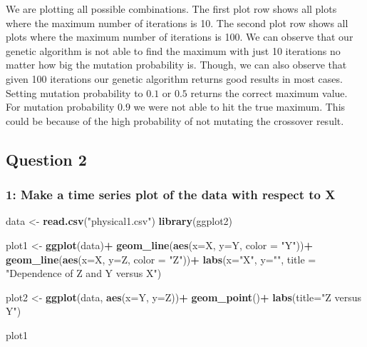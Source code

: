 \documentclass[
]{article}
\newenvironment{Shaded}{\begin{snugshade}}{\end{snugshade}}
\newcommand{\DataTypeTok}[1]{\textcolor[rgb]{0.13,0.29,0.53}{#1}}
\newcommand{\KeywordTok}[1]{\textcolor[rgb]{0.13,0.29,0.53}{\textbf{#1}}}
\newcommand{\NormalTok}[1]{#1}
\newcommand{\OperatorTok}[1]{\textcolor[rgb]{0.81,0.36,0.00}{\textbf{#1}}}
\newcommand{\StringTok}[1]{\textcolor[rgb]{0.31,0.60,0.02}{#1}}
\begin{document}
We are plotting all possible combinations. The first plot row shows all
plots where the maximum number of iterations is 10. The second plot row
shows all plots where the maximum number of iterations is 100. We can
observe that our genetic algorithm is not able to find the maximum with
just 10 iterations no matter how big the mutation probability is.
Though, we can also observe that given 100 iterations our genetic
algorithm returns good results in most cases. Setting mutation
probability to \(0.1\) or \(0.5\) returns the correct maximum value. For
mutation probability \(0.9\) we were not able to hit the true maximum.
This could be because of the high probability of not mutating the
crossover result.

\newpage

\hypertarget{question-2}{%
\subsection{Question 2}\label{question-2}}

\hypertarget{make-a-time-series-plot-of-the-data-with-respect-to-x}{%
\subsubsection{1: Make a time series plot of the data with respect to
X}\label{make-a-time-series-plot-of-the-data-with-respect-to-x}}

\begin{Shaded}
\begin{Highlighting}[]
\NormalTok{data <-}\StringTok{ }\KeywordTok{read.csv}\NormalTok{(}\StringTok{"physical1.csv"}\NormalTok{)}
\KeywordTok{library}\NormalTok{(ggplot2)}

\NormalTok{plot1 <-}\StringTok{ }\KeywordTok{ggplot}\NormalTok{(data)}\OperatorTok{+}
\StringTok{  }\KeywordTok{geom_line}\NormalTok{(}\KeywordTok{aes}\NormalTok{(}\DataTypeTok{x=}\NormalTok{X, }\DataTypeTok{y=}\NormalTok{Y, }\DataTypeTok{color =} \StringTok{"Y"}\NormalTok{))}\OperatorTok{+}
\StringTok{  }\KeywordTok{geom_line}\NormalTok{(}\KeywordTok{aes}\NormalTok{(}\DataTypeTok{x=}\NormalTok{X, }\DataTypeTok{y=}\NormalTok{Z, }\DataTypeTok{color =} \StringTok{"Z"}\NormalTok{))}\OperatorTok{+}
\StringTok{  }\KeywordTok{labs}\NormalTok{(}\DataTypeTok{x=}\StringTok{"X"}\NormalTok{, }\DataTypeTok{y=}\StringTok{""}\NormalTok{, }\DataTypeTok{title =} \StringTok{"Dependence of Z and Y versus X"}\NormalTok{)}

\NormalTok{plot2 <-}\StringTok{ }\KeywordTok{ggplot}\NormalTok{(data, }\KeywordTok{aes}\NormalTok{(}\DataTypeTok{x=}\NormalTok{Y, }\DataTypeTok{y=}\NormalTok{Z))}\OperatorTok{+}
\StringTok{  }\KeywordTok{geom_point}\NormalTok{()}\OperatorTok{+}
\StringTok{  }\KeywordTok{labs}\NormalTok{(}\DataTypeTok{title=}\StringTok{"Z versus Y"}\NormalTok{)}

\NormalTok{plot1}
\end{Highlighting}
\end{Shaded}
\end{document}
